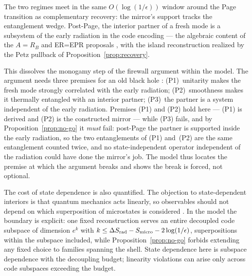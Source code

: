 \documentclass[12pt]{article}
\newcommand{\Smicro}{S_{\rm micro}}
\begin{document}
The two regimes meet in the same $O(\log(1/\epsilon))$ window around the
Page transition as complementary recovery: the mirror's support tracks the
entanglement wedge.  Post-Page, the interior partner of a fresh mode is a
subsystem of the early radiation in the code encoding --- the algebraic
content of the $A=R_B$ and ER=EPR proposals
\cite{VerlindeVerlinde2013,MaldacenaSusskind2013}, with the island
reconstruction realized by the Petz pullback of
Proposition~\ref{prop:recovery}.

This dissolves the monogamy step of the firewall argument within the model.
The argument needs three premises for an old black hole \cite{AMPS2013}:
(P1)~unitarity makes the fresh mode strongly correlated with the early
radiation; (P2)~smoothness makes it thermally entangled with an interior
partner; (P3)~the partner is a system independent of the early radiation.
Premises (P1) and (P2) hold here --- (P1) is derived and (P2) is the
constructed mirror --- while (P3) fails, and by
Proposition~\ref{prop:no-go} it \emph{must} fail: post-Page the partner is
supported inside the early radiation, so the two entanglements of (P1)
and~(P2) are the same entanglement counted twice, and no state-independent
operator independent of the radiation could have done the mirror's job.  The
model thus locates the premise at which the argument breaks and shows the
break is forced, not optional.

The cost of state dependence is also quantified.  The objection to
state-dependent interiors is that quantum mechanics acts linearly, so
observables should not depend on which superposition of microstates is
considered \cite{AMPSS2013,MarolfPolchinski2016}.  In the model the boundary
is explicit: one fixed reconstruction serves an entire decoupled code
subspace of dimension $e^k$ with
$k\le\Delta S_{\rm rad}-\Smicro-2\log(1/\epsilon)$, superpositions within the
subspace included, while Proposition~\ref{prop:no-go} forbids extending any
fixed choice to families spanning the shell.  State dependence here is
subspace dependence with the decoupling budget; linearity violations can
arise only across code subspaces exceeding the budget.
\end{document}
